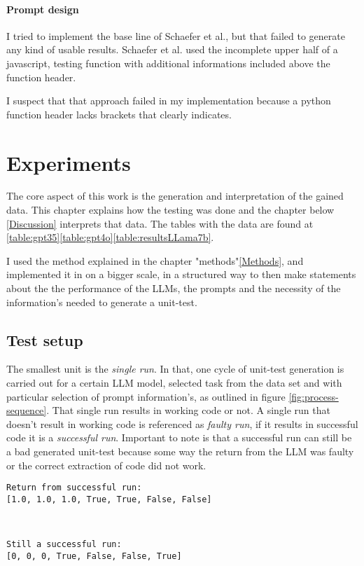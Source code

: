 \documentclass[a4paper,11pt,oneside]{memoir}
\begin{document}
\subsubsection{Prompt design}

I tried to implement the base line of Schaefer et al.\cite{Schaefer_automated_unit_test_generation}, but that failed to generate any kind of usable results. Schaefer et al. used the incomplete upper half of a javascript, testing function with additional informations included above the function header. 

I suspect that that approach failed in my implementation because a python function header lacks brackets that clearly indicates. 

\chapter{Experiments}
\label{Experiments}

The core aspect of this work is the generation and interpretation of the gained data. This chapter explains how the testing was done and the chapter below \ref{Discussion} interprets that data. The tables with the data are found at \ref{table:gpt35}\ref{table:gpt4o}\ref{table:resultsLLama7b}.

I used the method explained in the chapter "methods"\ref{Methods}, and implemented it in on a bigger scale, in a structured way to then make statements about the the performance of the LLMs, the prompts and the necessity of the information's needed to generate a unit-test.

\section{Test setup}
\label{testSetup}
The smallest unit is the \textit{single run}. In that, one cycle of unit-test generation is carried out for a certain LLM model, selected task from the data set and with particular selection of prompt information's, as outlined in figure \ref{fig:process-sequence}.
That single run results in working code or not. A single run that doesn't result in working code is referenced as \textit{faulty run}, if it results in successful code it is a \textit{successful run}. 
Important to note is that a successful run can still be a bad generated unit-test because some way the return from the LLM was faulty or the correct extraction of code did not work.  

\begin{verbatim}
Return from successful run:
[1.0, 1.0, 1.0, True, True, False, False]
\end{verbatim}\\
\begin{verbatim}
Still a successful run:
[0, 0, 0, True, False, False, True]
\end{verbatim}
\label{verbatim:returnFromRun}
\end{document}

